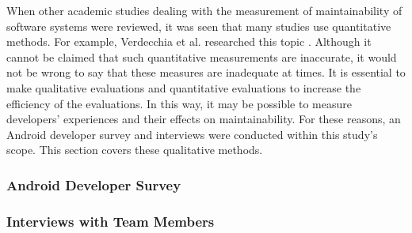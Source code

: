 When other academic studies dealing with the measurement of maintainability of software systems were reviewed, it was seen that many studies use quantitative methods. For example, Verdecchia et al. researched this topic \cite{14}. Although it cannot be claimed that such quantitative measurements are inaccurate, it would not be wrong to say that these measures are inadequate at times. It is essential to make qualitative evaluations and quantitative evaluations to increase the efficiency of the evaluations. In this way, it may be possible to measure developers' experiences and their effects on maintainability. For these reasons, an Android developer survey and interviews were conducted within this study's scope. This section covers these qualitative methods.

\subsubsection{Android Developer Survey}


\subsubsection{Interviews with Team Members}
\label{section:3.1.2}


